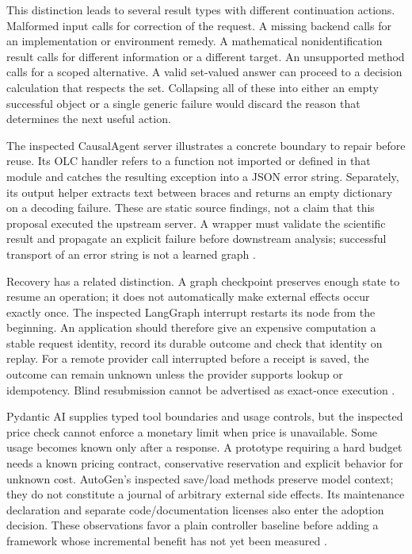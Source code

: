 This distinction leads to several result types with different continuation
actions. Malformed input calls for correction of the request. A missing backend
calls for an implementation or environment remedy. A mathematical
nonidentification result calls for different information or a different target.
An unsupported method calls for a scoped alternative. A valid set-valued answer
can proceed to a decision calculation that respects the set. Collapsing all of
these into either an empty successful object or a single generic failure would
discard the reason that determines the next useful action.

The inspected CausalAgent server illustrates a concrete boundary to repair
before reuse. Its OLC handler refers to a function not imported or defined in
that module and catches the resulting exception into a JSON error string.
Separately, its output helper extracts text between braces and returns an
empty dictionary on a decoding failure. These are static source findings, not
a claim that this proposal executed the upstream server. A wrapper must
validate the scientific result and propagate an explicit failure before
downstream analysis; successful transport of an error string is not a learned
graph \cite{v12_la_package_causalagent}.

Recovery has a related distinction. A graph checkpoint preserves enough state
to resume an operation; it does not automatically make external effects occur
exactly once. The inspected LangGraph interrupt restarts its node from the
beginning. An application should therefore give an expensive computation a
stable request identity, record its durable outcome and check that identity on
replay. For a remote provider call interrupted before a receipt is saved, the
outcome can remain unknown unless the provider supports lookup or idempotency.
Blind resubmission cannot be advertised as exact-once execution
\cite{v12_la04_langgraph}.

Pydantic AI supplies typed tool boundaries and usage controls, but the inspected
price check cannot enforce a monetary limit when price is unavailable. Some
usage becomes known only after a response. A prototype requiring a hard budget
needs a known pricing contract, conservative reservation and explicit behavior
for unknown cost. AutoGen's inspected save/load methods preserve model context;
they do not constitute a journal of arbitrary external side effects. Its
maintenance declaration and separate code/documentation licenses also enter
the adoption decision. These observations favor a plain controller baseline
before adding a framework whose incremental benefit has not yet been measured
\cite{v12_la04_pydantic_ai,v12_la04_autogen}.

